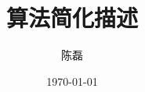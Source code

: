 \documentclass[a4paper,11pt,oneside]{book}
\begin{document}
\title{算法简化描述}
\author{陈磊}
\date{\today}

\maketitle
\frontmatter

\tableofcontents
\listofalgorithms

\mainmatter









\backmatter


\end{document}
